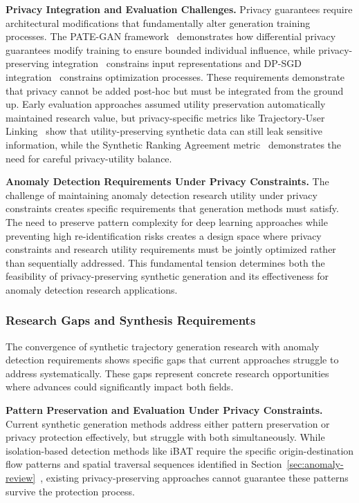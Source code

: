\documentclass[runningheads]{llncs}
\begin{document}
\textbf{Privacy Integration and Evaluation Challenges.} Privacy guarantees require architectural modifications that fundamentally alter generation training processes. The PATE-GAN framework~\cite{jordonPATEGANGeneratingSynthetic2019} demonstrates how differential privacy guarantees modify training to ensure bounded individual influence, while privacy-preserving integration~\cite{raoCATSConditionalAdversarial2023} constrains input representations and DP-SGD integration~\cite{merhiSyntheticTrajectoryGeneration2024} constrains optimization processes. These requirements demonstrate that privacy cannot be added post-hoc but must be integrated from the ground up. Early evaluation approaches assumed utility preservation automatically maintained research value, but privacy-specific metrics like Trajectory-User Linking~\cite{raoCATSConditionalAdversarial2023} show that utility-preserving synthetic data can still leak sensitive information, while the Synthetic Ranking Agreement metric~\cite{jordonPATEGANGeneratingSynthetic2019} demonstrates the need for careful privacy-utility balance.

\textbf{Anomaly Detection Requirements Under Privacy Constraints.} The challenge of maintaining anomaly detection research utility under privacy constraints creates specific requirements that generation methods must satisfy. The need to preserve pattern complexity for deep learning approaches while preventing high re-identification risks creates a design space where privacy constraints and research utility requirements must be jointly optimized rather than sequentially addressed. This fundamental tension determines both the feasibility of privacy-preserving synthetic generation and its effectiveness for anomaly detection research applications.

\subsubsection{Research Gaps and Synthesis Requirements}

The convergence of synthetic trajectory generation research with anomaly detection requirements shows specific gaps that current approaches struggle to address systematically. These gaps represent concrete research opportunities where advances could significantly impact both fields.

\textbf{Pattern Preservation and Evaluation Under Privacy Constraints.} Current synthetic generation methods address either pattern preservation or privacy protection effectively, but struggle with both simultaneously. While isolation-based detection methods like iBAT require the specific origin-destination flow patterns and spatial traversal sequences identified in Section~\ref{sec:anomaly-review}~\cite{zhangIBATDetectingAnomalous2011}, existing privacy-preserving approaches cannot guarantee these patterns survive the protection process.
\end{document}
